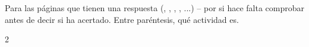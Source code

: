 \section*{\lblClave}

Para las páginas que tienen una respuesta (\lblRodea, \lblCuenta,
\lblBusca, \lblUne, \lblCompleta...) -- por si hace falta comprobar antes
de decir si ha acertado. Entre paréntesis, qué actividad es.

\begin{multicols}{2}
\footnotesize
\begin{itemize}[leftmargin=0mm, label={}, itemsep=2mm, topsep=0mm]

\end{itemize}
\end{multicols}
\newpage
